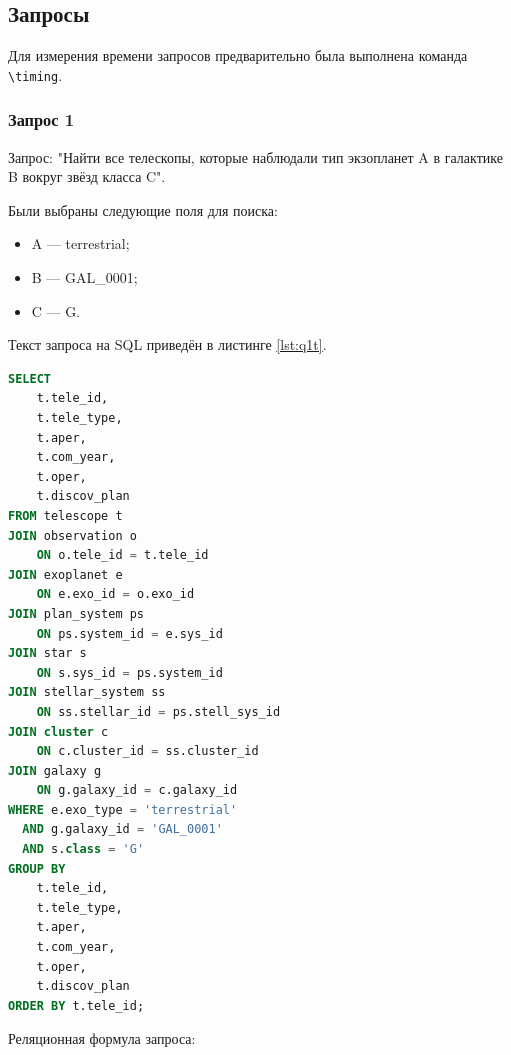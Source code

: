 \documentclass[14pt,a4paper]{extarticle}
\begin{document}
\subsection{Запросы}

Для измерения времени запросов предварительно была выполнена команда \texttt{\textbackslash{}timing}.

\subsubsection{Запрос 1}

Запрос: "Найти все телескопы, которые наблюдали тип экзопланет A в галактике B вокруг звёзд класса C".

Были выбраны следующие поля для поиска:

\begin{itemize}
  \item A --- terrestrial;
  \item B --- GAL\_0001;
  \item C --- G.
\end{itemize}

Текст запроса на SQL приведён в листинге \ref{lst:q1t}.

\begin{lstlisting}[language=SQL, caption={Текст запроса №1}, label={lst:q1t}]
SELECT
    t.tele_id,
    t.tele_type,
    t.aper,
    t.com_year,
    t.oper,
    t.discov_plan
FROM telescope t
JOIN observation o
    ON o.tele_id = t.tele_id
JOIN exoplanet e
    ON e.exo_id = o.exo_id
JOIN plan_system ps
    ON ps.system_id = e.sys_id
JOIN star s
    ON s.sys_id = ps.system_id
JOIN stellar_system ss
    ON ss.stellar_id = ps.stell_sys_id
JOIN cluster c
    ON c.cluster_id = ss.cluster_id
JOIN galaxy g
    ON g.galaxy_id = c.galaxy_id
WHERE e.exo_type = 'terrestrial'
  AND g.galaxy_id = 'GAL_0001'
  AND s.class = 'G'
GROUP BY
    t.tele_id,
    t.tele_type,
    t.aper,
    t.com_year,
    t.oper,
    t.discov_plan
ORDER BY t.tele_id;
\end{lstlisting}

Реляционная формула \cite{full-course}\cite{relation} запроса:
\end{document}
